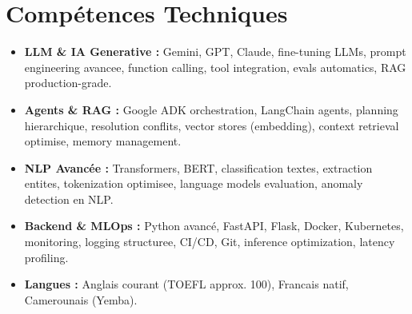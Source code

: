 \documentclass[a4paper,11pt]{article}
\begin{document}
\section{Comp\'etences Techniques}
\begin{itemize}[leftmargin=*, nosep]
    \item \small{\textbf{LLM \& IA Generative :} Gemini, GPT, Claude, fine-tuning LLMs, prompt engineering avancee, function calling, tool integration, evals automatics, RAG production-grade.}
    \item \small{\textbf{Agents \& RAG :} Google ADK orchestration, LangChain agents, planning hierarchique, resolution conflits, vector stores (embedding), context retrieval optimise, memory management.}
    \item \small{\textbf{NLP Avancée :} Transformers, BERT, classification textes, extraction entites, tokenization optimisee, language models evaluation, anomaly detection en NLP.}
    \item \small{\textbf{Backend \& MLOps :} Python avancé, FastAPI, Flask, Docker, Kubernetes, monitoring, logging structuree, CI/CD, Git, inference optimization, latency profiling.}
    \item \small{\textbf{Langues :} Anglais courant (TOEFL approx. 100), Francais natif, Camerounais (Yemba).}
\end{itemize}
\end{document}
